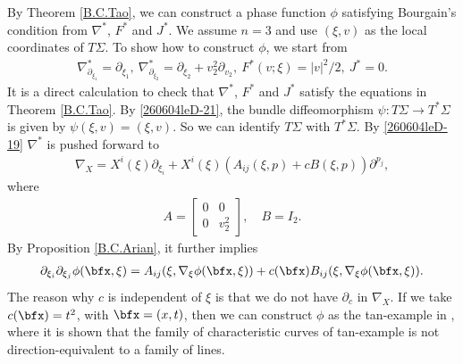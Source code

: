 \documentclass{article}
\numberwithin{equation}{section}
\theoremstyle{plain}
\begin{document}
By Theorem \ref{B.C.Tao}, we can construct a phase function $\phi$ satisfying Bourgain's condition from $\nabla^*$, $F^*$ and $J^*$. We assume $n=3$ and use $(\xi,v)$ as the local coordinates of $T\Sigma$. To show how to construct $\phi$, we start from 
\begin{align*}
     \nabla^*_{\partial_{\xi_1}} = \partial_{\xi_1},\  \nabla^*_{\partial_{\xi_2}} = \partial_{\xi_2}+ v^2_2\partial_{v_2},\  
     F^*(v;\xi)= |v|^2/2,\  J^*=0.
\end{align*}
It is a direct calculation to check that $\nabla^*$, $F^*$ and $J^*$ satisfy the equations in Theorem \ref{B.C.Tao}. By \eqref{260604leD-21}, the bundle diffeomorphism $\psi: T\Sigma\to T^*\Sigma$ is given by $\psi(\xi,v)= (\xi,v)$. So we can identify $T\Sigma$ with $T^*\Sigma$. By \eqref{260604leD-19} $\nabla^*$ is pushed forward to
\begin{align}
    \nabla_X=  X^i(\xi)\partial_{\xi_i}+ X^i(\xi)(A_{ij}(\xi,p)+ cB(\xi,p))\partial^{p_j},
\end{align}
where 
\begin{align}
    A=\begin{bmatrix}
        0 & 0\\
        0 & v_2^2
    \end{bmatrix},\quad
    B= I_{2}.
\end{align}
By Proposition \ref{B.C.Arian}, it further implies 
\begin{align}
     \partial_{\xi_i}\partial_{\xi_j}\phi(\bfx,\xi)= A_{ij}(\xi,\nabla_\xi\phi(\bfx,\xi))+ c(\bfx)B_{ij}(\xi,\nabla_\xi\phi(\bfx,\xi)).
\end{align}
The reason why $c$ is independent of $\xi$ is that we do not have $\partial_c$ in $\nabla_X$. If we take $c(\bfx)=t^2$, with $\bfx=(x,t)$, then we can construct $\phi$ as the \rm{tan}-example in \cite{nadjimzadah2026bourgainsconditionstickykakeya}, where it is shown that the family of characteristic curves of \rm{tan}-example is not direction-equivalent to a family of lines.
\end{document}
